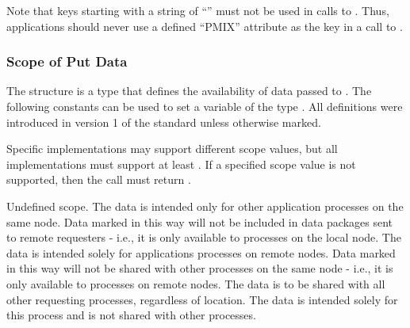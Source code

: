 \adviceuserstart
Note that keys starting with a string of ``'' must not be used in calls to . Thus, applications should never use a defined ``PMIX'' attribute as the key in a call to .
\adviceuserend


\subsubsection{Scope of Put Data}

The  structure is a  type that defines the availability of data passed to .
The following constants can be used to set a variable of the type . All definitions were introduced in version 1 of the standard unless otherwise marked.

Specific implementations may support different scope values, but all implementations must support at least .
If a specified scope value is not supported, then the  call must return .

\begin{constantdesc}
%
Undefined scope.
%
The data is intended only for other application processes on the same node.
Data marked in this way will not be included in data packages sent to remote requesters - i.e., it is only available to processes on the local node.
%
The data is intended solely for applications processes on remote nodes.
Data marked in this way will not be shared with other processes on the same node - i.e., it is only available to  processes on remote nodes.
%
The data is to be shared with all other requesting processes, regardless of location.
%
The data is intended solely for this process and is not shared with other processes.
%
\end{constantdesc}


\subsection{}

\summary


